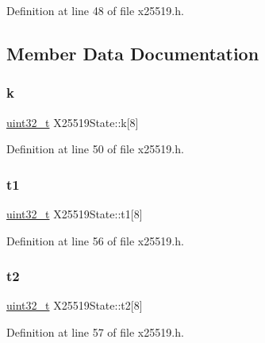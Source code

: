 Definition at line 48 of file x25519.\+h.



\subsection{Member Data Documentation}
\mbox{\label{structX25519State_aba67c25bd6f50ed73015a43499234369}} 
\subsubsection{\texorpdfstring{k}{k}}
{\footnotesize\ttfamily \hyperlink{stdint_8h_a435d1572bf3f880d55459d9805097f62}{uint32\+\_\+t} X25519\+State\+::k\mbox{[}8\mbox{]}}



Definition at line 50 of file x25519.\+h.

\mbox{\label{structX25519State_a02524016180bcfe425ca75b597b75143}} 
\subsubsection{\texorpdfstring{t1}{t1}}
{\footnotesize\ttfamily \hyperlink{stdint_8h_a435d1572bf3f880d55459d9805097f62}{uint32\+\_\+t} X25519\+State\+::t1\mbox{[}8\mbox{]}}



Definition at line 56 of file x25519.\+h.

\mbox{\label{structX25519State_a8652003f2315c681c8dd1ddd424a94c3}} 
\subsubsection{\texorpdfstring{t2}{t2}}
{\footnotesize\ttfamily \hyperlink{stdint_8h_a435d1572bf3f880d55459d9805097f62}{uint32\+\_\+t} X25519\+State\+::t2\mbox{[}8\mbox{]}}



Definition at line 57 of file x25519.\+h.

\mbox{\label{structX25519State_a57460e5477241280d8156c7a239e9260}} 
